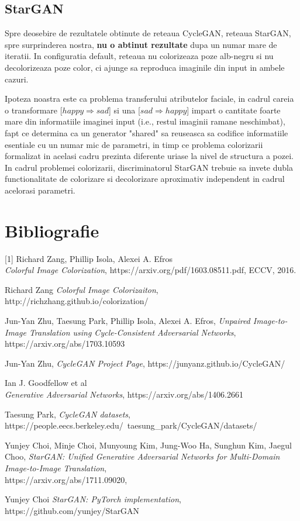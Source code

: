 \documentclass[12pt]{article}
\theoremstyle{definition}
\begin{document}
\subsection{StarGAN}

Spre deosebire de rezultatele obtinute de reteaua CycleGAN, reteaua StarGAN, spre surprinderea nostra, \textbf{nu o abtinut rezultate} dupa un numar mare de iteratii. In configuratia default, reteaua nu colorizeaza poze alb-negru si nu decolorizeaza poze color, ci ajunge sa reproduca imaginile din input in ambele cazuri.

Ipoteza noastra este ca problema transferului atributelor faciale, in cadrul careia o transformare [$happy \Rightarrow sad$] si una [$sad \Rightarrow happy$] impart o cantitate foarte mare din informatiile imaginei input (i.e., restul imaginii ramane neschimbat), fapt ce determina ca un generator "shared" sa reuseasca sa codifice informatiile esentiale cu un numar mic de parametri, in timp ce problema colorizarii formalizat in acelasi cadru prezinta diferente uriase la nivel de structura a pozei. In cadrul problemei colorizarii, discriminatorul StarGAN trebuie sa invete dubla functionalitate de colorizare si decolorizare aproximativ independent in cadrul acelorasi parametri. 

\section{Bibliografie}

[1] Richard Zang, Phillip Isola, Alexei A. Efros \\ \textit {Colorful Image Colorization}, https://arxiv.org/pdf/1603.08511.pdf, ECCV, 2016. \par
[2] Richard Zang \textit {Colorful Image Colorizaiton}, http://richzhang.github.io/colorization/ \par
[3] Jun-Yan Zhu, Taesung Park, Phillip Isola, Alexei A. Efros, \textit {Unpaired Image-to-Image Translation using Cycle-Consistent Adversarial Networks}, https://arxiv.org/abs/1703.10593 \par
[4] Jun-Yan Zhu, \textit{CycleGAN Project Page}, https://junyanz.github.io/CycleGAN/ \par
[5] Ian J. Goodfellow et al \\ \textit{Generative Adversarial Networks}, https://arxiv.org/abs/1406.2661 \par
[6] Taesung Park, \textit{CycleGAN datasets}, \\ https://people.eecs.berkeley.edu/~taesung\_park/CycleGAN/datasets/ \par
[7] Yunjey Choi, Minje Choi, Munyoung Kim, Jung-Woo Ha, Sunghun Kim, Jaegul Choo, \textit{StarGAN: Unified Generative Adversarial Networks for Multi-Domain Image-to-Image Translation}, \\
https://arxiv.org/abs/1711.09020, \par
[8] Yunjey Choi \textit{StarGAN: PyTorch implementation}, \\
https://github.com/yunjey/StarGAN
\end{document}
